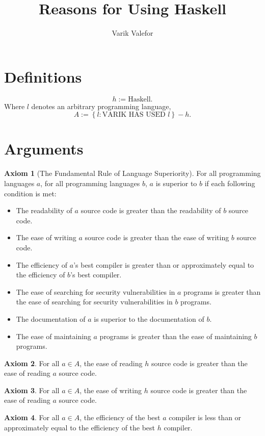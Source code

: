 \documentclass{article}
\title{Reasons for Using Haskell}
\author{Varik Valefor}
\theoremstyle{definition}
\newtheorem{axiom}{Axiom}
\begin{document}
	\maketitle
	\section{Definitions}
		\[
			h := \textrm{Haskell}.
		\]
		Where $l$ denotes an arbitrary programming language,
		\[
			A := \left\{l: \textrm{VARIK HAS USED } l\right\} - h.
		\]
	\section{Arguments}
	\begin{axiom}[The Fundamental Rule of Language Superiority]
		For all programming languages $a$, for all programming languages $b$, $a$ is superior to $b$ if each following condition is met:
		\begin{itemize}
			\item The readability of $a$ source code is greater than the readability of $b$ source code.
			\item The ease of writing $a$ source code is greater than the ease of writing $b$ source code.
			\item The efficiency of $a$'s best compiler is greater than or approximately equal to the efficiency of $b$'s best compiler.
			\item The ease of searching for security vulnerabilities in $a$ programs is greater than the ease of searching for security vulnerabilities in $b$ programs.
			\item The documentation of $a$ is superior to the documentation of $b$.
			\item The ease of maintaining $a$ programs is greater than the ease of maintaining $b$ programs.
		\end{itemize}
	\end{axiom}
	\begin{axiom}
		For all $a \in A$, the ease of reading $h$ source code is greater than
		the ease of reading $a$ source code.
	\end{axiom}
	\begin{axiom}
		For all $a \in A$, the ease of writing $h$ source code is greater than
		the ease of reading $a$ source code.
	\end{axiom}
	\begin{axiom}
		For all $a \in A$, the efficiency of the best $a$ compiler is less than
		or approximately equal to the efficiency of the best $h$ compiler.
	\end{axiom}
\end{document}
